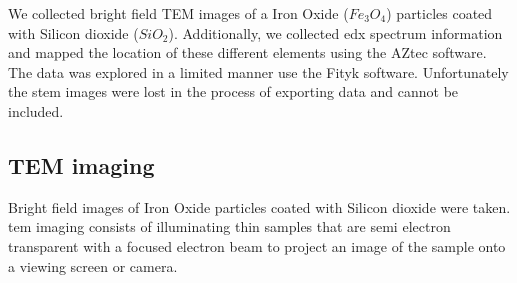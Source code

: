 \documentclass[12pt,a4paper]{article}
\begin{document}
We collected bright field TEM images of a Iron Oxide ($Fe_3O_4$) particles coated with Silicon dioxide ($SiO_2$).  Additionally, we collected \ac{edx} spectrum information and mapped the location of these different elements using the AZtec software.  The data was explored in a limited manner use the Fityk software.  Unfortunately the \ac{stem} images were lost in the process of exporting data and cannot be included.

\subsection{TEM imaging} %
\label{sub:tem_imaging}

Bright field images of Iron Oxide particles coated with Silicon dioxide were taken.  \ac{tem} imaging consists of illuminating thin samples that are semi electron transparent with a focused electron beam to project an image of the sample onto a viewing screen or camera.
\end{document}
